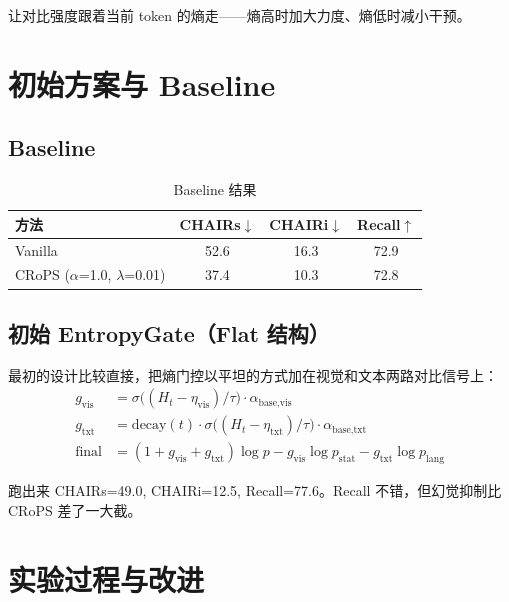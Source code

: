 \documentclass[12pt,a4paper]{ctexart}
\begin{document}
让对比强度跟着当前 token 的熵走——熵高时加大力度、熵低时减小干预。

\section{初始方案与 Baseline}

\subsection{Baseline}

\begin{table}[H]
\centering
\caption{Baseline 结果}
\label{tab:baseline}
\begin{tabular}{lccc}
\toprule
\textbf{方法} & \textbf{CHAIRs$\downarrow$} & \textbf{CHAIRi$\downarrow$} & \textbf{Recall$\uparrow$} \\
\midrule
Vanilla                    & 52.6 & 16.3 & 72.9 \\
CRoPS ($\alpha$=1.0, $\lambda$=0.01) & 37.4 & 10.3 & 72.8 \\
\bottomrule
\end{tabular}
\end{table}

\subsection{初始 EntropyGate（Flat 结构）}

最初的设计比较直接，把熵门控以平坦的方式加在视觉和文本两路对比信号上：
\begin{align}
g_{\text{vis}} &= \sigma\!\bigl((H_t - \eta_{\text{vis}})/\tau\bigr) \cdot \alpha_{\text{base,vis}} \\
g_{\text{txt}} &= \text{decay}(t) \cdot \sigma\!\bigl((H_t - \eta_{\text{txt}})/\tau\bigr) \cdot \alpha_{\text{base,txt}} \\
\text{final} &= (1 + g_{\text{vis}} + g_{\text{txt}}) \log p - g_{\text{vis}} \log p_{\text{stat}} - g_{\text{txt}} \log p_{\text{lang}}
\end{align}

跑出来 CHAIRs=49.0, CHAIRi=12.5, Recall=77.6。Recall 不错，但幻觉抑制比 CRoPS 差了一大截。

\section{实验过程与改进}
\end{document}
